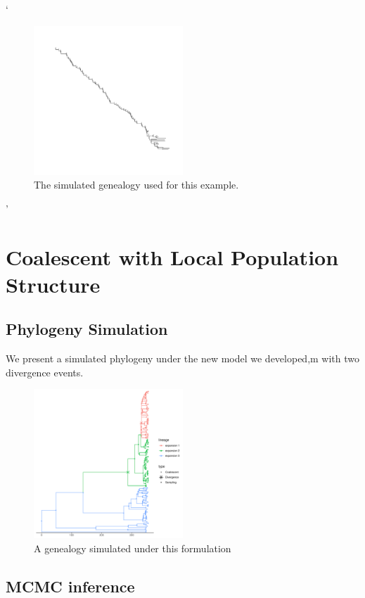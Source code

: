\documentclass{report}
\theoremstyle{definition}
\begin{document}
`\begin{figure}[H]
  \centering
    \includegraphics[width=0.5\textwidth]{../R/tree}
    \caption{The simulated genealogy used for this example.}
\end{figure}'
\section{Coalescent with Local Population Structure}
\subsection{Phylogeny Simulation}
We present a simulated phylogeny under the new model we developed,m with two divergence events.
\begin{figure}[H]
  \centering
     \includegraphics[width=0.5\textwidth]{../R/tree_structured}
    \caption{A genealogy simulated under this formulation}
\end{figure}
\subsection{MCMC inference}
\end{document}
